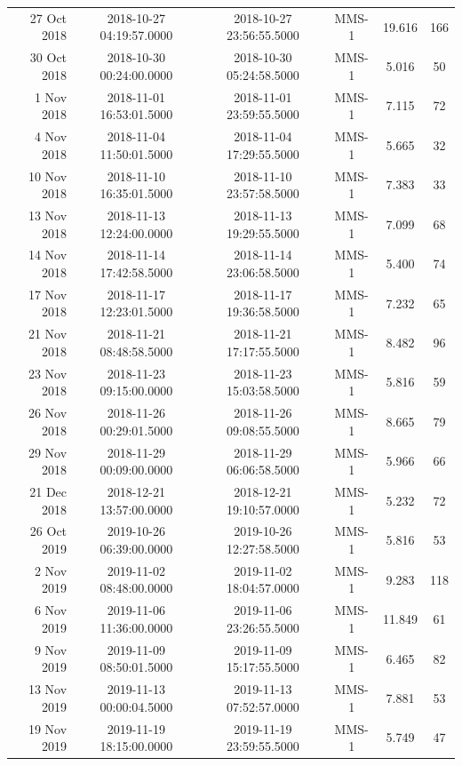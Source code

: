 \begin{longtable}{r|ccccc}
27 Oct 2018    &  2018-10-27 04:19:57.0000 &  2018-10-27 23:56:55.5000 &  MMS-1 &   19.616 &    166 \\
30 Oct 2018    &  2018-10-30 00:24:00.0000 &  2018-10-30 05:24:58.5000 &  MMS-1 &    5.016 &     50 \\
1 Nov 2018     &  2018-11-01 16:53:01.5000 &  2018-11-01 23:59:55.5000 &  MMS-1 &    7.115 &     72 \\
4 Nov 2018     &  2018-11-04 11:50:01.5000 &  2018-11-04 17:29:55.5000 &  MMS-1 &    5.665 &     32 \\
10 Nov 2018    &  2018-11-10 16:35:01.5000 &  2018-11-10 23:57:58.5000 &  MMS-1 &    7.383 &     33 \\
13 Nov 2018    &  2018-11-13 12:24:00.0000 &  2018-11-13 19:29:55.5000 &  MMS-1 &    7.099 &     68 \\
14 Nov 2018    &  2018-11-14 17:42:58.5000 &  2018-11-14 23:06:58.5000 &  MMS-1 &    5.400 &     74 \\
17 Nov 2018    &  2018-11-17 12:23:01.5000 &  2018-11-17 19:36:58.5000 &  MMS-1 &    7.232 &     65 \\
21 Nov 2018    &  2018-11-21 08:48:58.5000 &  2018-11-21 17:17:55.5000 &  MMS-1 &    8.482 &     96 \\
23 Nov 2018    &  2018-11-23 09:15:00.0000 &  2018-11-23 15:03:58.5000 &  MMS-1 &    5.816 &     59 \\
26 Nov 2018    &  2018-11-26 00:29:01.5000 &  2018-11-26 09:08:55.5000 &  MMS-1 &    8.665 &     79 \\
29 Nov 2018    &  2018-11-29 00:09:00.0000 &  2018-11-29 06:06:58.5000 &  MMS-1 &    5.966 &     66 \\
21 Dec 2018    &  2018-12-21 13:57:00.0000 &  2018-12-21 19:10:57.0000 &  MMS-1 &    5.232 &     72 \\
26 Oct 2019    &  2019-10-26 06:39:00.0000 &  2019-10-26 12:27:58.5000 &  MMS-1 &    5.816 &     53 \\
2 Nov 2019     &  2019-11-02 08:48:00.0000 &  2019-11-02 18:04:57.0000 &  MMS-1 &    9.283 &    118 \\
6 Nov 2019     &  2019-11-06 11:36:00.0000 &  2019-11-06 23:26:55.5000 &  MMS-1 &   11.849 &     61 \\
9 Nov 2019     &  2019-11-09 08:50:01.5000 &  2019-11-09 15:17:55.5000 &  MMS-1 &    6.465 &     82 \\
13 Nov 2019    &  2019-11-13 00:00:04.5000 &  2019-11-13 07:52:57.0000 &  MMS-1 &    7.881 &     53 \\
19 Nov 2019    &  2019-11-19 18:15:00.0000 &  2019-11-19 23:59:55.5000 &  MMS-1 &    5.749 &     47 \\

\end{longtable}
